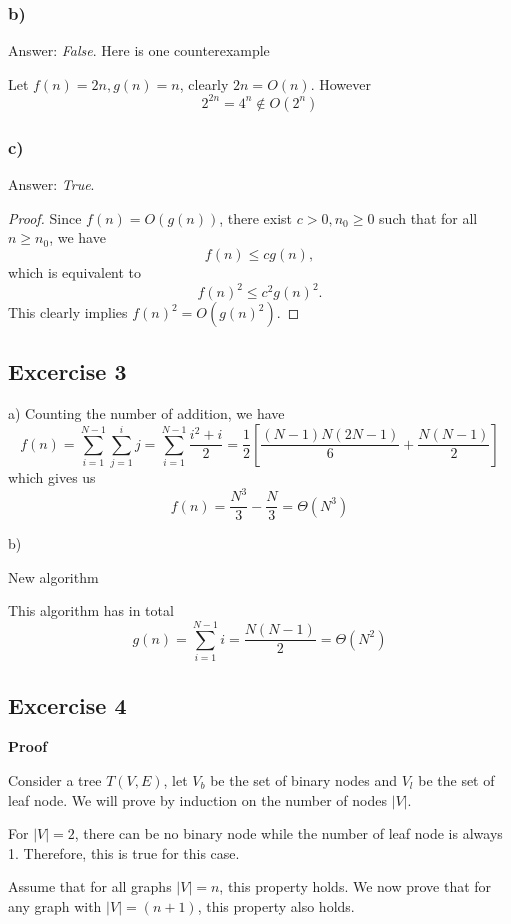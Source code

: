 \documentclass[a4paper,10pt,twoside]{article}
\newtheorem{proof}{Proof}
\begin{document}
\subsubsection*{b)}
Answer: \emph{False}. Here is one counterexample

Let $f(n) = 2n, g(n) = n$, clearly $2n=O(n)$. However 
\[
 	2 ^ {2n} = 4^n \notin O(2^n)
 \] 
\subsubsection*{c)}
Answer: \emph{True}.
\begin{proof}
Since $f(n)=O(g(n))$, there exist $c > 0, n_0 \geq 0$ such that for all $n \geq n_0$,
we have
\[
	f(n) \leq c g(n),
\]
which is equivalent to
\[
	f(n)^2 \leq c^2 g(n) ^2.
\]
This clearly implies $f(n)^2=O(g(n)^2)$.
\end{proof}
\subsection*{Excercise 3}
a) Counting the number of addition, we have
\[
	f(n) 
	= \sum_{i=1}^{N-1} \sum_{j=1}^i j = \sum_{i=1}^{N-1} \frac{i^2 + i}{2} 
	= \frac{1}{2} \left[ \frac{(N-1)N(2N-1)}{6}	+ \frac{N(N-1)}{2}\right]
\]
which gives us
\[
	f(n) = \frac{N^3}{3} - \frac{N}{3} = \Theta(N^3)
\]

b) 
\begin{algorithm}[h]
  \caption{New algorithm}
  \SetAlgoNoLine
  \Indm
  \Indp 
\end{algorithm}

This algorithm has in total
\[
	g(n) = \sum_{i=1}^{N-1}i = \frac{N(N-1)}{2}=\Theta(N^2)
\]
\subsection*{Excercise 4}
\textbf{Proof}
	
	Consider a tree $T(V, E)$,
	let $V_b$ be the set of binary nodes and $V_l$ be the set of leaf node. 
	We will prove by induction on the number of nodes $|V|$.

	For $|V| = 2$, there can be no binary node while the number of leaf node
	is always 1. Therefore, this is true for this case.

	Assume that for all graphs $|V| = n$, this property holds. We now prove that for
	any graph with $|V| = (n+1)$, this property also holds. 
\end{document}
